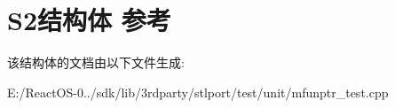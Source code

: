 \hypertarget{struct_s2}{}\section{S2结构体 参考}
\label{struct_s2}


该结构体的文档由以下文件生成\+:\begin{DoxyCompactItemize}
\item 
E\+:/\+React\+O\+S-\/0../sdk/lib/3rdparty/stlport/test/unit/mfunptr\+\_\+test.\+cpp\end{DoxyCompactItemize}
